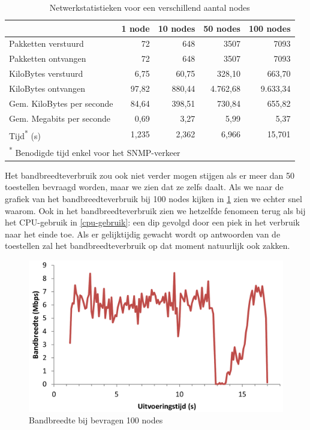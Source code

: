 \begin{table}[h]
\centering
\begin{tabular}{@{}lrrrr@{}}
\toprule
                           & 1 node & 10 nodes & 50 nodes & 100 nodes \\ \midrule
Pakketten verstuurd        & 72     & 648      & 3507     & 7093      \\
Pakketten ontvangen        & 72     & 648      & 3507     & 7093      \\
KiloBytes verstuurd        & 6,75   & 60,75    & 328,10   & 663,70    \\
KiloBytes ontvangen        & 97,82  & 880,44   & 4.762,68  & 9.633,34   \\
Gem. KiloBytes per seconde & 84,64  & 398,51   & 730,84   & 655,82    \\
Gem. Megabits per seconde  & 0,69   & 3,27     & 5,99     & 5,37      \\
Tijd\textsuperscript{*} (s)& 1,235  & 2,362    & 6,966    & 15,701    \\ \midrule[.5pt]
\multicolumn{4}{l}{\textsuperscript{*} \footnotesize{Benodigde tijd enkel voor het SNMP-verkeer}}
\end{tabular}
\caption{Netwerkstatistieken voor een verschillend aantal nodes}
\label{tabel-bandbreedte-aantalnodes}
\end{table}

Het bandbreedteverbruik zou ook niet verder mogen stijgen als er meer dan 50 toestellen bevraagd worden,
maar we zien dat ze zelfs daalt.
Als we naar de grafiek van het bandbreedteverbruik bij 100 nodes kijken in \cref{fig-bandbreedte-100-nodes}
zien we echter snel waarom.
Ook in het bandbreedteverbruik zien we hetzelfde fenomeen terug als bij het CPU-gebruik in \cref{cpu-gebruik}:
een dip gevolgd door een piek in het verbruik naar het einde toe.
Als er gelijktijdig gewacht wordt op antwoorden van de toestellen zal het bandbreedteverbruik op dat moment natuurlijk ook zakken.

\begin{figure}[h]
	\centering
	\includegraphics[scale=0.40]{figures/bandbreedte/bandbreedte-100nodes}
	\caption{Bandbreedte bij bevragen 100 nodes}
	\label{fig-bandbreedte-100-nodes}
\end{figure}

